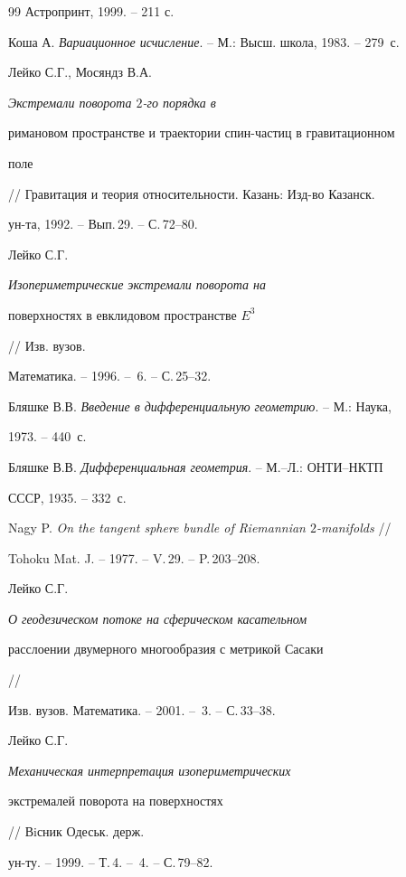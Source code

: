 \begin{thebibliography}{99}
Астропринт, 1999. -- 211 с. 




Коша А. {\em Вариационное исчисление}. -- М.: Высш. школа, 1983. -- 279~с. 




Лейко С.Г., Мосяндз В.А. {\em Экстремали поворота $2$-го порядка в 


римановом пространстве и траектории спин-частиц в гравитационном 


поле} // Гравитация и теория относительности. Казань: Изд-во Казанск.


ун-та, 1992. -- Вып.\,29. -- С.\,72--80. 




Лейко С.Г. {\em Изопериметрические экстремали поворота на 


поверхностях в евклидовом пространстве $E^3$} // Изв. вузов. 


Математика. -- 1996. -- \No\,6. -- С.\,25--32. 




Бляшке В.В. {\em Введение в дифференциальную геометрию}. -- М.: Наука, 


1973. -- 440~с. 




Бляшке В.В. {\em Дифференциальная геометрия}. -- М.--Л.: ОНТИ--НКТП 


СССР, 1935. -- 332~с. 




Nagy P. {\em On the tangent sphere bundle of Riemannian $2$-manifolds} // 


Tohoku Mat. J. -- 1977. -- V.\,29. -- P.\,203--208. 




Лейко С.Г. {\em О геодезическом потоке на сферическом касательном 


расслоении двумерного многообразия с метрикой Сасаки} // 


Изв. вузов. Математика. -- 2001. -- \No\,3. -- С.\,33--38. 




Лейко С.Г. {\em Механическая интерпретация изопериметрических 


экстремалей поворота на поверхностях} // Вiсник Одеськ. держ. 


ун-ту. -- 1999. -- Т.\,4. -- \No\,4. -- С.\,79--82. 


 


\end{thebibliography} 


 


\vskip 2cm 


 






 


\label{end} 


 


